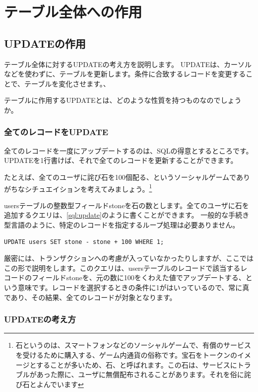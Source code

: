 \chapter{テーブル全体への作用}


\section{UPDATEの作用}

テーブル全体に対するUPDATEの考え方を説明します。
UPDATEは、カーソルなどを使わずに、テーブルを更新します。条件に合致するレコードを変更することで、テーブルを変化させます。、

テーブルに作用するUPDATEとは、どのような性質を持つものなのでしょうか。

\subsection{全てのレコードをUPDATE}
全てのレコードを一度にアップデートするのは、SQLの得意とするところです。UPDATEを1行書けば、それで全てのレコードを更新することができます。

たとえば、全てのユーザに詫び石を100個配る、というソーシャルゲームでありがちなシチュエイションを考えてみましょう。\footnote{石というのは、スマートフォンなどのソーシャルゲームで、有償のサービスを受けるために購入する、ゲーム内通貨の俗称です。宝石をトークンのイメージとすることが多いため、石、と呼ばれます。この石は、サービスにトラブルがあった際に、ユーザに無償配布されることがあります。それを俗に詫び石とよんでいます}

usersテーブルの整数型フィールドstoneを石の数とします。全てのユーザに石を追加するクエリは、\ref{sql:update}のように書くことができます。
一般的な手続き型言語のように、特定のレコードを指定するループ処理は必要ありません。

\begin{lstlisting}[caption=全体に作用するupdate,label=sql+update]
UPDATE users SET stone - stone + 100 WHERE 1;
\end{lstlisting}

厳密には、トランザクションへの考慮が入っていなかったりしますが、ここではこの形で説明をします。このクエリは、usersテーブルのレコードで該当するレコードのフィールドstoneを、元の数に100をくわえた値でアップデートする、という意味です。レコードを選択するときの条件に1がはいっているので、常に真であり、その結果、全てのレコードが対象となります。


\subsection{UPDATEの考え方}

